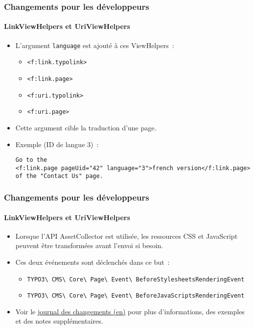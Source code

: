 \begin{frame}[fragile]
	\frametitle{Changements pour les développeurs}
	\framesubtitle{LinkViewHelpers et UriViewHelpers}

	\lstset{basicstyle=\tiny\ttfamily}

	\begin{itemize}
		\item L'argument \texttt{language} est ajouté à ces ViewHelpers~:
			\begin{itemize}
				\item \texttt{<f:link.typolink>}
				\item \texttt{<f:link.page>}
				\item \texttt{<f:uri.typolink>}
				\item \texttt{<f:uri.page>}
			\end{itemize}

		\item Cette argument cible la traduction d'une page.
		\item Exemple (ID de langue 3)~:
\begin{lstlisting}
Go to the
<f:link.page pageUid="42" language="3">french version</f:link.page>
of the "Contact Us" page.
\end{lstlisting}

	\end{itemize}

\end{frame}


\begin{frame}[fragile]
	\frametitle{Changements pour les développeurs}
	\framesubtitle{LinkViewHelpers et UriViewHelpers}

	\begin{itemize}
		\item Lorsque l'API AssetCollector est utilisée, les ressources CSS et JavaScript
			peuvent être transformées avant l'envoi si besoin.
		\item Ces deux événements sont déclenchés dans ce but~:
			\begin{itemize}\smaller
				\item \texttt{TYPO3\textbackslash
					CMS\textbackslash
					Core\textbackslash
					Page\textbackslash
					Event\textbackslash
					BeforeStylesheetsRenderingEvent}
				\item \texttt{TYPO3\textbackslash
					CMS\textbackslash
					Core\textbackslash
					Page\textbackslash
					Event\textbackslash
					BeforeJavaScriptsRenderingEvent}
			\end{itemize}

		\item Voir le
			\href{https://docs.typo3.org/c/typo3/cms-core/master/en-us/Changelog/10.4/Feature-90899-IntroduceAssetPreRenderingEvents.html}{journal des changements (en)}
			pour plus d'informations, des exemples et des notes supplémentaires.
	\end{itemize}

\end{frame}

